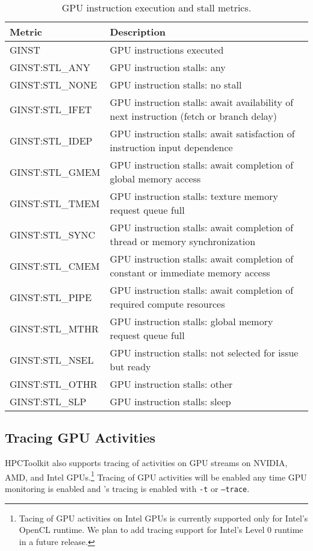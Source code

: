 \begin{table}[t]
\centering
\begin{tabular}{|l|p{3.5in}|}\hline
Metric & Description\\\hline\hline
GINST & GPU instructions executed\\\hline
GINST:STL\_ANY  &  GPU instruction stalls: any  \\\hline 
 GINST:STL\_NONE  &  GPU instruction stalls: no stall  \\\hline 
 GINST:STL\_IFET  &  GPU instruction stalls: await availability of next    instruction (fetch or branch delay)  \\\hline 
 GINST:STL\_IDEP  &  GPU instruction stalls: await satisfaction of instruction    input dependence  \\\hline 
 GINST:STL\_GMEM  &  GPU instruction stalls: await completion of global memory    access  \\\hline 
 GINST:STL\_TMEM  &  GPU instruction stalls: texture memory request queue full  \\\hline 
 GINST:STL\_SYNC  &  GPU instruction stalls: await completion of thread or    memory synchronization  \\\hline 
 GINST:STL\_CMEM  &  GPU instruction stalls: await completion of constant or    immediate memory access  \\\hline 
 GINST:STL\_PIPE  &  GPU instruction stalls: await completion of required    compute resources  \\\hline 
 GINST:STL\_MTHR  &  GPU instruction stalls: global memory request queue full  \\\hline 
 GINST:STL\_NSEL  &  GPU instruction stalls: not selected for issue but ready  \\\hline 
 GINST:STL\_OTHR  &  GPU instruction stalls: other  \\\hline 
 GINST:STL\_SLP  &  GPU instruction stalls: sleep  \\\hline 
\end{tabular}
\caption{GPU instruction execution and stall metrics.}
\label{table:pc-stall}
\end{table}

\subsection{Tracing GPU Activities}
HPCToolkit also supports tracing of activities on GPU streams on NVIDIA, AMD, and Intel GPUs.\footnote{Tacing of GPU activities on Intel GPUs is currently supported only for Intel's OpenCL runtime. We plan to add tracing support for Intel's Level 0 runtime in a future release.}  Tracing of GPU activities will be enabled any time GPU monitoring is enabled and \hpcrun's tracing is enabled with {\tt -t} or {\tt --trace}.

